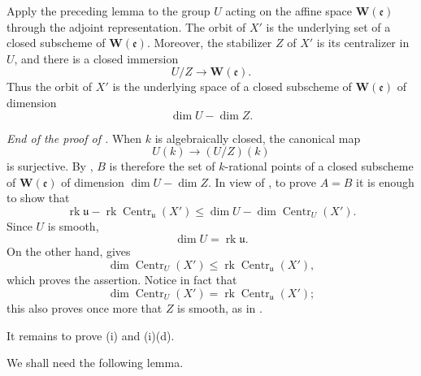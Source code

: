 Apply the preceding lemma to the group \(U\) acting on the affine
space \(\mathbf W(\mathfrak e)\) through the adjoint representation.
The orbit of \(X'\) is the underlying set of a closed subscheme of
\(\mathbf W(\mathfrak e)\).  Moreover, the stabilizer \(Z\) of
\(X'\) is its centralizer in \(U\), and there is a closed immersion
\[
  U/Z\longrightarrow\mathbf W(\mathfrak e).
\]
Thus the orbit of \(X'\) is the underlying space of a closed
subscheme of \(\mathbf W(\mathfrak e)\) of dimension
\[
  \dim U-\dim Z.
\]

\smallskip
\noindent
{} \emph{End of the proof of .}
When \(k\) is algebraically closed, the canonical map
\[
  U(k)\longrightarrow(U/Z)(k)
\]
is surjective.  By , \(B\) is therefore the set of \(k\)-rational
points of a closed subscheme of \(\mathbf W(\mathfrak e)\) of
dimension \(\dim U-\dim Z\).  In view of , to prove \(A=B\) it is
enough to show that
\[
  \operatorname{rk}\mathfrak u
  -\operatorname{rk}\operatorname{Centr}_{\mathfrak u}(X')
  \leq
  \dim U-\dim\operatorname{Centr}_U(X').
\]
Since \(U\) is smooth,
\[
  \dim U=\operatorname{rk}\mathfrak u.
\]
On the other hand,  gives
\[
  \dim\operatorname{Centr}_U(X')
  \leq
  \operatorname{rk}\operatorname{Centr}_{\mathfrak u}(X'),
\]
which proves the assertion.  Notice in fact that
\[
  \dim\operatorname{Centr}_U(X')
  =
  \operatorname{rk}\operatorname{Centr}_{\mathfrak u}(X');
\]
this also proves once more that \(Z\) is smooth, as in .




It remains to prove (i) and (i)(d).

We shall need the following lemma.

